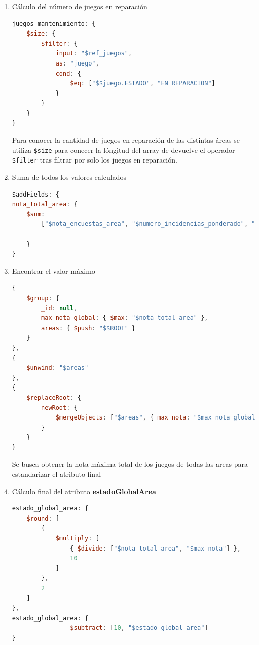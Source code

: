 \documentclass[]{article}
\begin{document}
\begin{itemize}
\begin{enumerate}
        \item Cálculo del número de juegos en reparación 
        
        \begin{lstlisting}[caption=Calculo del número de juegos en reparación, language=JavaScript]
juegos_mantenimiento: {
    $size: {
        $filter: {
            input: "$ref_juegos",
            as: "juego",
            cond: {
                $eq: ["$$juego.ESTADO", "EN REPARACION"]
            }
        }
    }
}
        \end{lstlisting}

        Para conocer la cantidad de juegos en reparación de las distintas áreas
        se utiliza \texttt{\$size} para conecer la lóngitud del array de
        devuelve el operador \texttt{\$filter} tras filtrar por solo los juegos en reparación.

        \item Suma de todos los valores calculados
        
        \begin{lstlisting}[language=JavaScript, caption=Calculo de not\_total\_area]
$addFields: {
nota_total_area: {
    $sum: 
        ["$nota_encuestas_area", "$numero_incidencias_ponderado", "$juegos_mantenimiento"]
    
    }
}
        \end{lstlisting}

        \item Encontrar el valor máximo
        
        \begin{lstlisting}[language=JavaScript, caption=Agrupación de áreas previa a la normalización]
{
    $group: {
        _id: null,
        max_nota_global: { $max: "$nota_total_area" },
        areas: { $push: "$$ROOT" }
    }
},
{
    $unwind: "$areas"
},
{
    $replaceRoot: {
        newRoot: {
            $mergeObjects: ["$areas", { max_nota: "$max_nota_global" }]
        }
    }
}
        \end{lstlisting}

        Se busca obtener la nota máxima total de los juegos de todas las areas para estandarizar el atributo final
    
        \item Cálculo final del atributo \textbf{estadoGlobalArea}
        
        \begin{lstlisting}[language=JavaScript, caption=Cálculo de estado\_global\_area]
estado_global_area: {
    $round: [
        {
            $multiply: [
                { $divide: ["$nota_total_area", "$max_nota"] },
                10
            ]
        },
        2
    ]
},
estado_global_area: {
                $subtract: [10, "$estado_global_area"]
}
        \end{lstlisting}


\end{enumerate}
\end{itemize}
\end{document}
